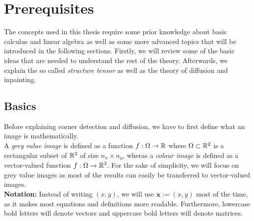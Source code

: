 \chapter{Prerequisites}\label{ch:Theory}
The concepts used in this thesis require some prior knowledge about basic calculus and linear
algebra as well as some more advanced topics that will be introduced in the following sections.
Firstly, we will review some of the basic ideas that are needed to understand the rest of the
theory.
Afterwards, we explain the so called \textit{structure tensor} as well as the 
theory of diffusion and inpainting.
\section{Basics}\label{sec:Basics}
Before explaining corner detection and diffusion, we have to first define what an image is
mathematically.\\
A \textit{grey value image} is defined as a function $f: \Omega \rightarrow \mathbb{R}$ where
$\Omega \subset \mathbb{R}^2$ is a rectangular subset of $\mathbb{R}^2$ of size $n_x\times n_y$,
wheras a
\textit{colour image} is defined as a vector-valued function $f: \Omega \rightarrow \mathbb{R}^3$.
For the sake of simplicity, we will focus on grey value images as most of the results can easily be
transferred to vector-valued images.\\
\textbf{Notation:} Instead of writing $(x, y)$, we will use $\boldsymbol x := (x, y)$ most of the
time, as it makes most equations and definitions more readable. Furthermore, lowercase bold letters will denote vectors and uppercase bold letters will
denote matrices.
